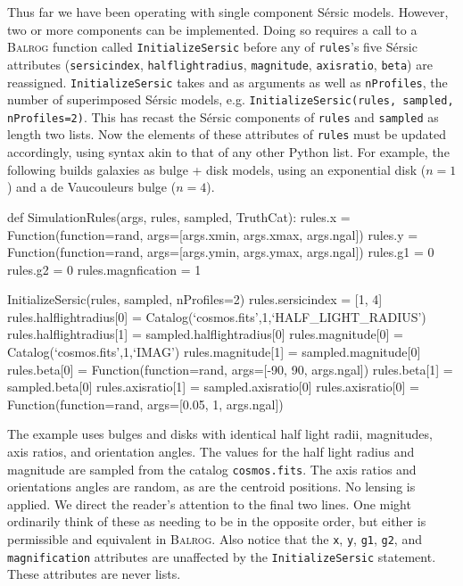 \documentclass[11pt]{book}
\newcommand{\codett}[1]{\texttt{#1}}
\newcommand{\py}{Python}
\newcommand{\balrog}{\textsc{Balrog}}
\newcommand{\sersic}{S\'{e}rsic}
\begin{document}
Thus far we have been operating with single component \sersic{} models.
However, two or more components can be implemented.
Doing so requires a call to a \balrog{} function called \codett{InitializeSersic}
before any of \codett{rules}'s five \sersic{} attributes 
(\codett{sersicindex}, \codett{halflightradius}, \codett{magnitude}, \codett{axisratio}, \codett{beta})
are reassigned.
\codett{InitializeSersic} takes \simrules{} and \simsamp{} as arguments as well as \codett{nProfiles},
the number of superimposed \sersic{} models, e.g.
\codett{InitializeSersic(rules, sampled, nProfiles=2)}.
This has recast the \sersic{} components of \codett{rules} and \codett{sampled} as length two lists.
Now the elements of these attributes of \codett{rules} must be updated accordingly,
using syntax akin to that of any other \py{} list. For example, the following builds
galaxies as bulge + disk models, using an exponential disk ($n = 1$) and a de Vaucouleurs bulge ($n = 4$).

\begin{code}
def SimulationRules(args, rules, sampled, TruthCat):
    rules.x = Function(function=rand, args=[args.xmin, args.xmax, args.ngal])
    rules.y = Function(function=rand, args=[args.ymin, args.ymax, args.ngal])
    rules.g1 = 0
    rules.g2 = 0
    rules.magnfication = 1

    InitializeSersic(rules, sampled, nProfiles=2)
    rules.sersicindex = [1, 4]
    rules.halflightradius[0] = Catalog(`cosmos.fits',1,`HALF_LIGHT_RADIUS')
    rules.halflightradius[1] = sampled.halflightradius[0]
    rules.magnitude[0] = Catalog(`cosmos.fits',1,`IMAG')
    rules.magnitude[1] = sampled.magnitude[0]
    rules.beta[0] = Function(function=rand, args=[-90, 90, args.ngal])
    rules.beta[1] = sampled.beta[0]
    rules.axisratio[1] = sampled.axisratio[0]
    rules.axisratio[0] = Function(function=rand, args=[0.05, 1, args.ngal])
\end{code}

\noindent The example uses bulges and disks with identical half light radii,
magnitudes, axis ratios, and orientation angles.
The values for the half light radius and magnitude are sampled from the catalog \codett{cosmos.fits}.
The axis ratios and orientations angles are random, as are the centroid positions.
No lensing is applied.
We direct the reader's attention to the final two lines.
One might ordinarily think of these as needing to be in the opposite order, but either is permissible 
and equivalent in \balrog{}.
Also notice that the \codett{x}, \codett{y}, \codett{g1}, \codett{g2}, and \codett{magnification}
attributes are unaffected by the \codett{InitializeSersic} statement. These attributes are never lists.
\end{document}

